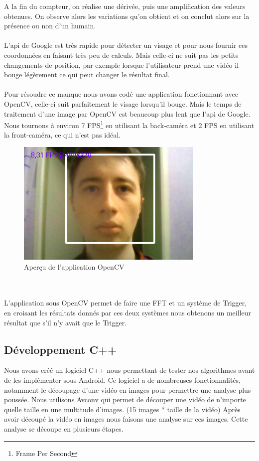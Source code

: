 A la fin du compteur, on réalise une dérivée, puis une amplification des valeurs obtenues. On observe alors les variations qu'on obtient et on conclut alors sur la présence ou non d'un humain.\\
\\
L'api de Google est très rapide pour détecter un visage et pour nous fournir ces coordonnées en faisant très peu de calculs. Mais celle-ci ne suit pas les petits changements de position, par exemple lorsque l'utilisateur prend une vidéo il bouge légèrement ce qui peut changer le résultat final.\\
\\
Pour résoudre ce manque nous avons codé une application fonctionnant avec OpenCV, celle-ci suit parfaitement le visage lorsqu'il bouge. Mais le temps de traitement d'une image par OpenCV est beaucoup plus lent que l'api de Google. Nous tournons à environ 7 FPS\footnote{Frame Per Second} en utilisant la back-caméra et 2 FPS en utilisant la front-caméra, ce qui n'est pas idéal.
\begin{figure}[h!]
	\centering
	\includegraphics[width=0.8\textwidth]{data/opencv.png}
	\caption{Aperçu de l'application OpenCV}
\end{figure}
\\
\\
L'application sous OpenCV permet de faire une FFT et un système de Trigger, en croisant les résultats donnés par ces deux systèmes nous obtenons un meilleur résultat que s'il n'y avait que le Trigger.

\subsection{Développement C++}

Nous avons créé un logiciel C++ nous permettant de tester nos algorithmes avant de les implémenter sous Android.
Ce logiciel a de nombreuses fonctionnalités, notamment le découpage d'une vidéo en images pour permettre une analyse plus poussée.
Nous utilisons Avconv qui permet de découper une vidéo de n'importe quelle taille en une multitude d'images. (15 images * taille de la vidéo)
Après avoir découpé la vidéo en images nous faisons une analyse sur ces images.
Cette analyse se découpe en plusieurs étapes.\\

